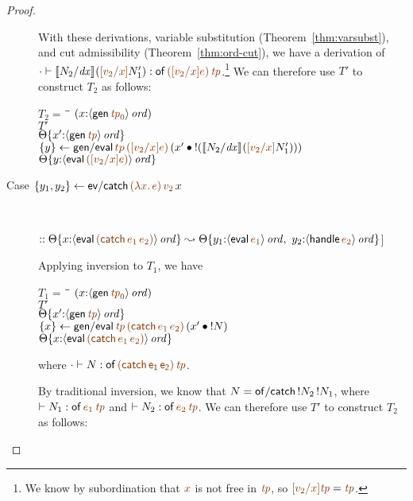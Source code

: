\begin{proof}
\begin{description}
With these derivations, 
variable substitution (Theorem~\ref{thm:varsubst}), and cut
admissibility (Theorem~\ref{thm:ord-cut}), we have a derivation of
$\cdot \vdash \rsubst{N_2}{\it dx}{(\lf{[v_2/x]}N_1')} : {\sf
  of}\,\lf{([v_2/x]e)}\,\lf{\it tp}$.\footnote{We know by
  subordination that $\lf{x}$ is not free in $\lf{\it tp}$, so
  $\lf{[v_2/x]{\it tp}} = \lf{\it tp}$.}  We can therefore use $T'$ to
construct $T_2$ as follows:
\begin{tabbing}
$T_2 = ~$ \= \qquad \= $(x{:}\istrue{\susp{{\sf gen}\,\lf{{\it tp}_0}}})$
\\
\>$T'$
\\
\>\>$\tackon{\Theta}{x'{:}\istrue{\susp{{\sf gen}\,\lf{\it tp}}}}$
\\
\>$\trstep{y}
     {{\sf gen/eval}\,\lf{tp}\,\lf{([v_2/x]e)}\,(\tfuser{x'}{\tbangr{(\rsubst{N_2}{\it
  dx}{(\lf{[v_2/x]}N_1')})}})}$
\\
\>\>$\tackon{\Theta}{y{:}\istrue{\susp{{\sf eval}\,\lf{([v_2/x]e)}}}}$
\end{tabbing}

\item 
  [Case $\trstep{y_1,y_2}{{\sf ev/catch}\,\lf{(\lambda x.\,e)}\,\lf{v_2}\,x}$]~
 
\qquad $:: \tackon{\Theta}{x{:}\istrue{\susp{{\sf eval}\,\lf{({\sf catch}\,e_1\,e_2)}}}}
       \leadsto 
        \tackon{\Theta}{y_1{:}\istrue{\susp{{\sf eval}\,\lf{e_1}}}, ~
                   y_2{:}\istrue{\susp{{\sf handle}\,\lf{e_2}}}}$]~

\medskip
Applying inversion to $T_1$, we have

\begin{tabbing}
$T_1 = ~$ \= \qquad \= $(x{:}\istrue{\susp{{\sf gen}\,\lf{{\it tp}_0}}})$
\\
\>$T'$
\\
\>\>$\tackon{\Theta}{x'{:}\istrue{\susp{{\sf gen}\,\lf{{\it tp}}}}}$
\\
\>$\trstep{x}
     {{\sf gen/eval}\,\lf{\it tp}\,\lf{({\sf catch}\,e_1\,e_2)}\,(\tfuser{x'}{\tbangr{N}})}$
\\
\>\>$\tackon{\Theta}{x{:}\istrue{\susp{{\sf eval}\,\lf{({\sf catch}\,e_1\,e_2)}}}}$
\end{tabbing}
where $\cdot \vdash N : \sf of\,\lf{({\sf catch}\,e_1\,e_2)}\,\lf{\it tp}$. 

\medskip
By traditional inversion, we 
know that $N = {\sf of/catch}\,{!}{N_2}\,{!}{N_1}$, where
 $\vdash N_1 : {\sf of}\,\lf{e_1}\,\lf{\it tp}$ and $\vdash N_2 :
{\sf of}\,\lf{e_2}\,\lf{\it tp}$.
We can therefore use $T'$ to construct $T_2$ as follows:


\end{description}
\end{proof}
